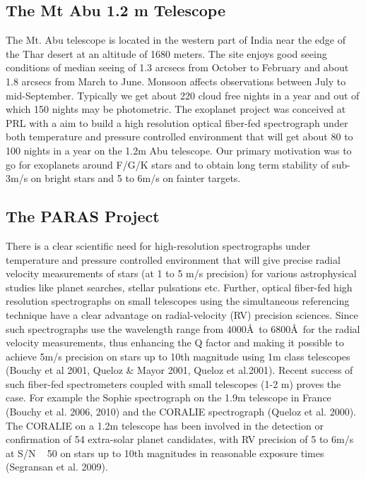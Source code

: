 \documentclass[12pt,preprint]{emulateapj}
\begin{document}
\subsection{The Mt Abu 1.2 m Telescope}
The Mt. Abu telescope is located in the western part of India near the edge of the Thar desert at an altitude
of 1680 meters. The site enjoys good seeing conditions of median seeing of 1.3 arcsecs from October to February and 
about 1.8 arcsecs from March to June. Monsoon affects observations between July to mid-September. Typically we 
get about 220 cloud free nights in a year and out of which 150 nights may be photometric. The exoplanet project was
conceived at PRL with a aim to build a high resolution optical fiber-fed spectrograph under both temperature and
pressure controlled environment that will get about 80 to 100 nights in a year on the 1.2m Abu telescope. Our primary
motivation was to go for exoplanets around F/G/K stars and to obtain long term stability of sub-3m/s on bright stars
and 5 to 6m/s on fainter targets. 
\subsection{ The PARAS Project}
There is a clear scientific need for high-resolution spectrographs under temperature and pressure controlled environment 
that will give precise radial velocity measurements of stars (at 1 to 5 m/s precision) for various astrophysical studies 
like planet searches, stellar pulsations etc. Further, optical fiber-fed high resolution spectrographs on small telescopes 
using the simultaneous referencing technique have a clear advantage on radial-velocity (RV) precision sciences. Since
such spectrographs use the wavelength range from 4000\AA\ to 6800\AA\ for the radial velocity measurements, 
thus enhancing the Q factor and making it possible to achieve 5m/s precision on stars up to 10th magnitude 
using 1m class telescopes (Bouchy et al 2001, Queloz \& Mayor 2001, Queloz et al.2001). Recent success of such 
fiber-fed spectrometers coupled with small telescopes (1-2 m) proves the case. For example the Sophie 
spectrograph on the 1.9m telescope in France (Bouchy et al. 2006, 2010) and the CORALIE spectrograph (Queloz et al. 2000). 
The CORALIE on a 1.2m telescope has been involved in the detection or confirmation of 54 extra-solar planet candidates, 
with RV precision of 5 to 6m/s at S/N ~ 50 on stars up to 10th magnitudes in reasonable exposure times 
(Segransan et al. 2009).   

\end{document}
